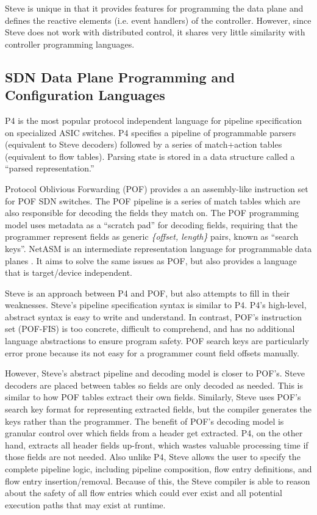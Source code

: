 Steve is unique in that it provides features for programming the data plane
and defines the reactive elements (i.e. event handlers) of the controller. However, since Steve
does not work with distributed control, it shares very little similarity with 
controller programming languages.

\subsection{SDN Data Plane Programming and Configuration Languages} \label{rel:p4}

P4 is the most popular protocol independent language for pipeline specification
 \cite{p4_spec, p4_spec2, p42014} on specialized ASIC switches.
P4 specifies a pipeline of programmable parsers (equivalent to Steve decoders) followed
by a series of match+action
tables (equivalent to flow tables). Parsing state is stored in a data structure
called a ``parsed representation.''

Protocol Oblivious Forwarding (POF) \cite{pof_fis, pof, pof_impl} provides a
an assembly-like instruction set for POF SDN switches.
The POF pipeline is a series of match tables which are also
responsible for decoding the fields they match on. 
The POF programming model uses metadata as a ``scratch pad'' for decoding fields,
requiring that the programmer represent fields as generic \textit{\{offset, length\}} pairs, 
known as ``search keys''. 
NetASM is an intermediate representation language for programmable data planes
\cite{shahbaz2015netasm}. It aims to solve the same issues as POF, but also provides a language that is target/device independent.

Steve is an approach between P4 and POF, but also attempts to
fill in their weaknesses. 
Steve's pipeline specification syntax is similar to P4.
P4's high-level, abstract syntax is easy to write and understand. 
In contrast, POF's instruction set (POF-FIS) \cite{pof_fis} is too
concrete, difficult to comprehend, and has no additional language
abstractions to ensure program safety.
POF search keys are particularly error prone because its not easy
for a programmer count field offsets manually.

However, Steve's abstract pipeline and decoding model is closer to POF's.
Steve decoders are placed between tables so fields are only decoded
as needed. This is similar to how POF tables extract their own fields.
Similarly, Steve uses POF's search key format for representing extracted fields, but the compiler generates the keys rather than the programmer.
The benefit of POF's decoding model is granular control over which fields from a header get extracted.
P4, on the other hand, extracts all header fields up-front, which wastes 
valuable processing time if those fields are not needed.
Also unlike P4, Steve allows the user to specify the complete pipeline logic, including pipeline composition, flow entry definitions, and flow entry insertion/removal. Because of this, the Steve compiler is able to reason about the safety of all flow entries which could ever exist and all potential execution paths that may exist at runtime.


